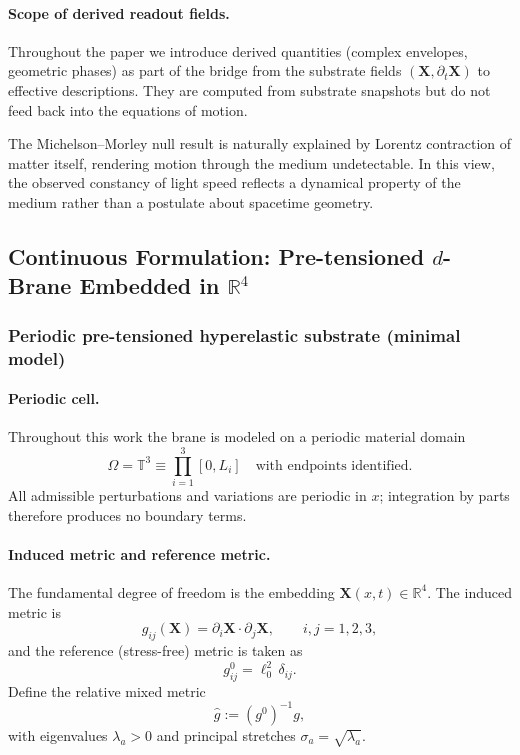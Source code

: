 \paragraph{Scope of derived readout fields.}
Throughout the paper we introduce derived quantities (complex envelopes, geometric phases)
as part of the bridge from the substrate fields $(\mathbf X,\partial_t\mathbf X)$ to effective
descriptions. They are computed from substrate snapshots but do not feed back into the
equations of motion.

The Michelson–Morley null result is naturally explained by Lorentz contraction of matter itself, rendering motion through the medium undetectable. In this view, the observed constancy of light speed reflects a dynamical property of the medium rather than a postulate about spacetime geometry.

\subsection{Continuous Formulation: Pre-tensioned $d$-Brane Embedded in $\mathbb{R}^4$}\label{continuous-formulation}

\subsubsection{Periodic pre-tensioned hyperelastic substrate (minimal model)}
\label{sec:periodic-pretension-minimal}

\paragraph{Periodic cell.}
Throughout this work the brane is modeled on a periodic material domain
\[
  \Omega=\mathbb T^3 \equiv \prod_{i=1}^3 [0,L_i]\quad\text{with endpoints identified.}
\]
All admissible perturbations and variations are periodic in $x$; integration by
parts therefore produces no boundary terms.

\paragraph{Induced metric and reference metric.}
The fundamental degree of freedom is the embedding $\mathbf X(x,t)\in\mathbb R^4$.
The induced metric is
\begin{equation}
  g_{ij}(\mathbf X)=\partial_i\mathbf X\cdot\partial_j\mathbf X,
  \qquad i,j=1,2,3,
  \label{eq:induced-metric}
\end{equation}
and the reference (stress-free) metric is taken as
\begin{equation}
  g^0_{ij}=\ell_0^2\,\delta_{ij}.
  \label{eq:reference-metric}
\end{equation}
Define the relative mixed metric
\begin{equation}
  \widehat g := (g^0)^{-1}g,
  \label{eq:relative-metric}
\end{equation}
with eigenvalues $\lambda_a>0$ and principal stretches $\sigma_a=\sqrt{\lambda_a}$.

